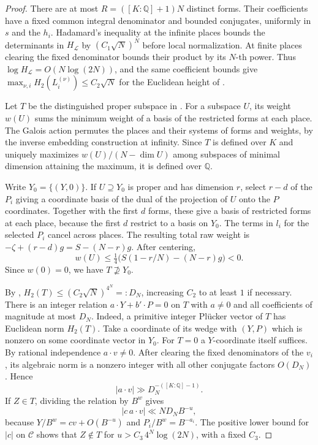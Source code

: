 \documentclass[11pt,reqno,a4paper]{amsart}
\theoremstyle{remark}
\begin{document}
\begin{proof}
There are at most \(R=([K:\mathbb Q]+1)N\) distinct forms.
Their coefficients have a fixed common integral denominator
and bounded conjugates, uniformly in \(s\) and the \(h_i\).
Hadamard's inequality at the infinite places bounds the
determinants in \(H_{\mathcal L}\) by \((C_1\sqrt N)^N\)
before local normalization. At finite places clearing the fixed
denominator bounds their product by its \(N\)-th power.
Thus \(\log H_{\mathcal L}=O(N\log(2N))\), and the same
coefficient bounds give \(\max_{\nu,i} H_2(L_i^{(\nu)})\le C_2\sqrt N\)
for the Euclidean height of \cite[\S6]{cnt-evertse-ferretti}.

Let \(T\) be the distinguished proper subspace in
\cite[(2.19)--(2.21)]{cnt-evertse-ferretti}. For a subspace \(U\),
its weight \(w(U)\) sums the minimum weight of a basis of the
restricted forms at each place. The Galois action permutes the
places and their systems of forms and weights, by the inverse
embedding construction at infinity. Since \(T\) is defined over
\(K\) and uniquely maximizes \(w(U)/(N-\dim U)\) among subspaces
of minimal dimension attaining the maximum, it is defined over
\(\mathbb Q\).

Write \(Y_0=\{(Y,0)\}\). If \(U\supseteq Y_0\) is proper and has
dimension \(r\), select \(r-d\) of the \(P_i\) giving a coordinate
basis of the dual of the projection of \(U\) onto the \(P\)
coordinates. Together with the first \(d\) forms, these give a
basis of restricted forms at each place, because the first \(d\)
restrict to a basis on \(Y_0\). The terms in \(l_i\) for the
selected \(P_i\) cancel across places. The resulting total raw
weight is \(-\zeta+(r-d)g=S-(N-r)g\). After centering,
\[
 w(U)\le \tfrac14\bigl(S(1-r/N)-(N-r)g\bigr)<0.
\]
Since \(w(0)=0\), we have \(T\not\supseteq Y_0\).

By \cite[Proposition~17.5]{cnt-evertse-ferretti},
\(H_2(T)\le (C_2\sqrt N)^{4^N}=:D_N\), increasing \(C_2\) to at
least \(1\) if necessary. There is an integer relation
\(a\cdot Y+b'\cdot P=0\) on \(T\) with \(a\ne0\) and all
coefficients of magnitude at most \(D_N\). Indeed, a primitive
integer Pl\"ucker vector of \(T\) has Euclidean norm \(H_2(T)\).
Take a coordinate of its wedge with \((Y,P)\) which is nonzero
on some coordinate vector in \(Y_0\). For \(T=0\) a \(Y\)-coordinate
itself suffices. By rational independence \(a\cdot v\ne0\).
After clearing the fixed denominators of the \(v_i\), its
algebraic norm is a nonzero integer with all other conjugate
factors \(O(D_N)\). Hence
\[
 |a\cdot v|\gg D_N^{-([K:\mathbb Q]-1)}.
\]
If \(Z\in T\), dividing the relation by \(B^w\) gives
\[
 |c\,a\cdot v|\ll N D_N B^{-u},
\]
because \(Y/B^w=cv+O(B^{-u})\) and \(P_i/B^w=B^{-a_i}\).
The positive lower bound for \(|c|\) on \(\mathcal C\) shows that
\(Z\notin T\) for \(u>C_3\,4^N\log(2N)\), with a fixed \(C_3\).


\end{proof}
\end{document}
